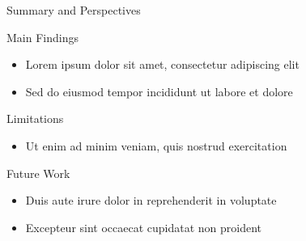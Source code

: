 \begin{frame}{Summary and Perspectives}
  \begin{block}{Main Findings}
    \begin{itemize}
      \item Lorem ipsum dolor sit amet, consectetur adipiscing elit
      \item Sed do eiusmod tempor incididunt ut labore et dolore
    \end{itemize}
  \end{block}

  \begin{alertblock}{Limitations}
    \begin{itemize}
      \item Ut enim ad minim veniam, quis nostrud exercitation
    \end{itemize}
  \end{alertblock}

  \begin{exampleblock}{Future Work}
    \begin{itemize}
      \item Duis aute irure dolor in reprehenderit in voluptate
      \item Excepteur sint occaecat cupidatat non proident
    \end{itemize}
  \end{exampleblock}
\end{frame}
